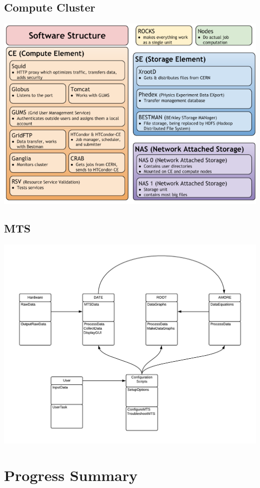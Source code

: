 \documentclass[12pt]{article}
\begin{document}
\subsection{Compute Cluster}
\includegraphics{Cluster_Design_Image.png}
\subsection{MTS}
\includegraphics[scale=.75]{image3.png}
\section{Progress Summary}
\end{document}
